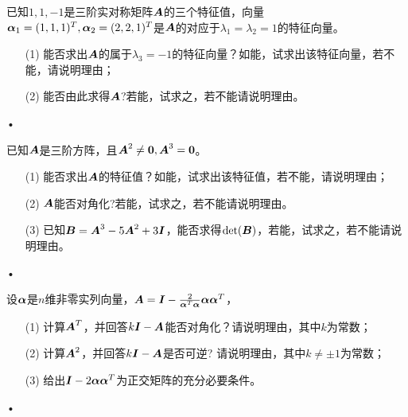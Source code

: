         \begin{frame}                     
          \begin{li}[07-08下]
            已知$1,1,-1$是三阶实对称矩阵$\boldsymbol{A}$的三个特征值，向量$\boldsymbol{\alpha}_1=(1,1,1)^T,\boldsymbol{\alpha}_2=(2,2,1)^T$是$\boldsymbol{A}$的对应于$\lambda_1=\lambda_2=1$的特征向量。
            \begin{itemize}
            \item[(1)] 能否求出$\boldsymbol{A}$的属于$\lambda_3=-1$的特征向量？如能，试求出该特征向量，若不能，请说明理由；
            \item[(2)]能否由此求得$\boldsymbol{A}$?若能，试求之，若不能请说明理由。

            \end{itemize}•
          \end{li}
        \end{frame}

        \begin{frame}
          \begin{li}[08-09上]
            已知$\boldsymbol{A}$是三阶方阵，且$\MA^2\ne \M0, \MA^3=\M0$。
            \begin{itemize}
            \item[(1)] 能否求出$\boldsymbol{A}$的特征值？如能，试求出该特征值，若不能，请说明理由；
            \item[(2)] $\boldsymbol{A}$能否对角化?若能，试求之，若不能请说明理由。
            \item[(3)] 已知$\boldsymbol{B}=\boldsymbol{A}^3-5\boldsymbol{A}^2+3\boldsymbol{I}$，能否求得$\mathrm{det}(\boldsymbol{B})$，若能，试求之，若不能请说明理由。

            \end{itemize}•
          \end{li}
          
        \end{frame}



        \begin{frame}                     
          \begin{li}[09-10下]
            设$\boldsymbol{\alpha}$是$n$维非零实列向量，$\boldsymbol{A}=\boldsymbol{I}-\frac2{\boldsymbol{\alpha}^T\boldsymbol{\alpha}}\boldsymbol{\alpha}\boldsymbol{\alpha}^T$，
            \begin{itemize}
            \item[(1)] 计算$\boldsymbol{A}^T$，并回答$k\boldsymbol{I}-\boldsymbol{A}$能否对角化？请说明理由，其中$k$为常数；
            \item[(2)] 计算$\boldsymbol{A}^2$，并回答$k\boldsymbol{I}-\boldsymbol{A}$是否可逆? 请说明理由，其中$k\ne\pm 1$为常数；
            \item[(3)] 给出$\boldsymbol{I}-2\boldsymbol{\alpha}\boldsymbol{\alpha}^T$为正交矩阵的充分必要条件。
            \end{itemize}•
          \end{li}
        \end{frame}

